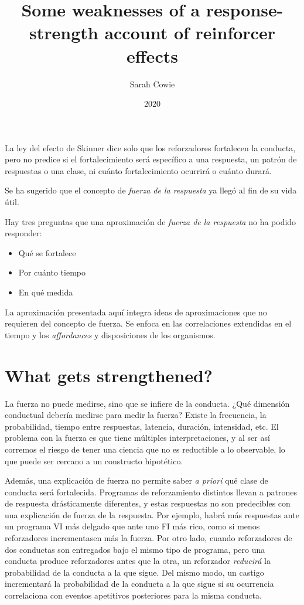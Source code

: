 \documentclass[a4paper,12pt]{article}
\title{Some weaknesses of a response-strength account of reinforcer effects}
\author{Sarah Cowie}
\date{2020}
\begin{document}
{\scshape\bfseries \maketitle}

La ley del efecto de Skinner dice solo que los reforzadores fortalecen la conducta, pero no predice si el fortalecimiento será específico a una respuesta, un patrón de respuestas o una clase, ni cuánto fortalecimiento ocurrirá o cuánto durará.

Se ha sugerido que el concepto de {\itshape fuerza de la respuesta} ya llegó al fin de su vida útil.

Hay tres preguntas que una aproximación de {\itshape fuerza de la respuesta} no ha podido responder:
\begin{itemize}
    \item Qué se fortalece
    \item Por cuánto tiempo
    \item En qué medida
\end{itemize}

La aproximación presentada aquí integra ideas de aproximaciones que no requieren del concepto de fuerza. Se enfoca en las correlaciones extendidas en el tiempo y los {\itshape affordances} y disposiciones de los organismos.

\section{What gets strengthened?}

La fuerza no puede medirse, sino que se infiere de la conducta. ¿Qué dimensión conductual debería medirse para medir la fuerza? Existe la frecuencia, la probabilidad, tiempo entre respuestas, latencia, duración, intensidad, etc.
El problema con la fuerza es que tiene múltiples interpretaciones, y al ser así corremos el riesgo de tener una ciencia que no es reductible a lo observable, lo que puede ser cercano a un constructo hipotético.

Además, una explicación de fuerza no permite saber {\itshape a priori} qué clase de conducta será fortalecida. Programas de reforzamiento distintos llevan a patrones de respuesta drásticamente diferentes, y estas respuestas no son predecibles con una explicación de fuerza de la respuesta.
Por ejemplo, habrá más respuestas ante un programa VI más delgado que ante uno FI más rico, como si menos reforzadores incrementasen más la fuerza. Por otro lado, cuando reforzadores de dos conductas son entregados bajo el mismo tipo de programa, pero una conducta produce reforzadores antes que la otra, un reforzador {\itshape reducirá} la probabilidad de la conducta a la que sigue.
Del mismo modo, un castigo incrementará la probabilidad de la conducta a la que sigue si su ocurrencia correlaciona con eventos apetitivos posteriores para la misma conducta.
\end{document}
